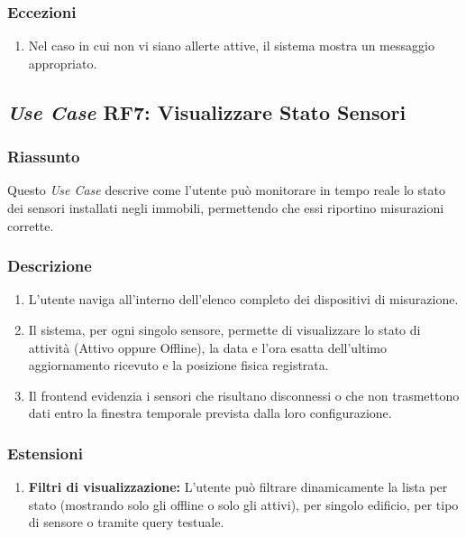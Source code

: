         \subsubsection*{Eccezioni}
            \begin{enumerate}
                \item Nel caso in cui non vi siano allerte attive, il sistema mostra un messaggio appropriato.
            \end{enumerate}

    \subsection*{\textit{Use Case} RF7: Visualizzare Stato Sensori}
        \subsubsection*{Riassunto}
            Questo \textit{Use Case} descrive come l'utente può monitorare in tempo reale lo stato dei sensori installati negli immobili, permettendo che essi riportino misurazioni corrette.
        \subsubsection*{Descrizione}
            \begin{enumerate}
                \item L'utente naviga all'interno dell'elenco completo dei dispositivi di misurazione.
                \item Il sistema, per ogni singolo sensore, permette di visualizzare lo stato di attività (Attivo oppure Offline), la data e l'ora esatta dell'ultimo aggiornamento ricevuto e la posizione fisica registrata.
                \item Il frontend evidenzia i sensori che risultano disconnessi o che non trasmettono dati entro la finestra temporale prevista dalla loro configurazione.
            \end{enumerate}
        \subsubsection*{Estensioni}
            \begin{enumerate}
                \item \textbf{Filtri di visualizzazione:} L'utente può filtrare dinamicamente la lista per stato (mostrando solo gli offline o solo gli attivi), per singolo edificio, per tipo di sensore o tramite query testuale.
            \end{enumerate}

